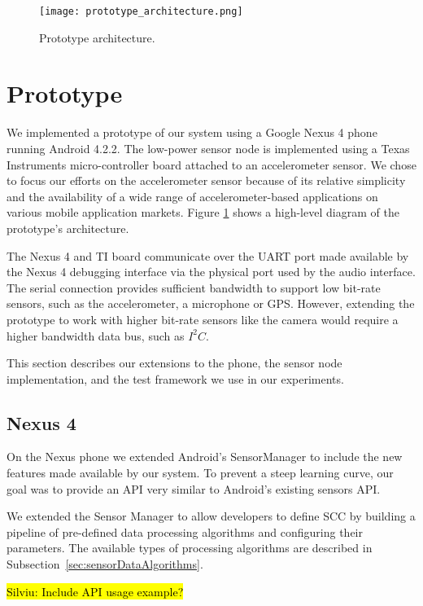 
\begin{figure}[t]
	\texttt{[image: prototype\_architecture.png]}
	\caption{Prototype architecture.}
    \label{fig:prototypeArchitecture}
\end{figure}

\section{Prototype}
\label{sec:prototype}

We implemented a prototype of our system using a Google Nexus 4 phone
running Android 4.2.2.  The low-power sensor node is implemented using
a Texas Instruments micro-controller board attached to an
accelerometer sensor.  We chose to focus our efforts on the
accelerometer sensor because of its relative simplicity and the
availability of a wide range of accelerometer-based applications on
various mobile application markets.  Figure
\ref{fig:prototypeArchitecture} shows a high-level diagram of the
prototype's architecture.

The Nexus 4 and TI board communicate over the UART port made available
by the Nexus 4 debugging interface via the physical port used by the
audio interface.  The serial connection provides sufficient bandwidth
to support low bit-rate sensors, such as the accelerometer, a
microphone or GPS.  However, extending the prototype to work with
higher bit-rate sensors like the camera would require a higher
bandwidth data bus, such as $I^2C$.

This section describes our extensions to the phone, the
sensor node implementation, and the test
framework we use in our experiments.

\subsection{Nexus 4}
\label{subsec:nexus}

On the Nexus phone we extended Android's SensorManager to include the
new features made available by our system. To prevent a steep learning
curve, our goal was to provide an API very similar to Android's
existing sensors API.  

We extended the Sensor Manager to allow developers to define SCC by building
a pipeline of pre-defined data processing algorithms and configuring their
parameters. The available types of processing algorithms are
described in Subsection~\ref{sec:sensorDataAlgorithms}.

\hl{Silviu: Include API usage example?}

